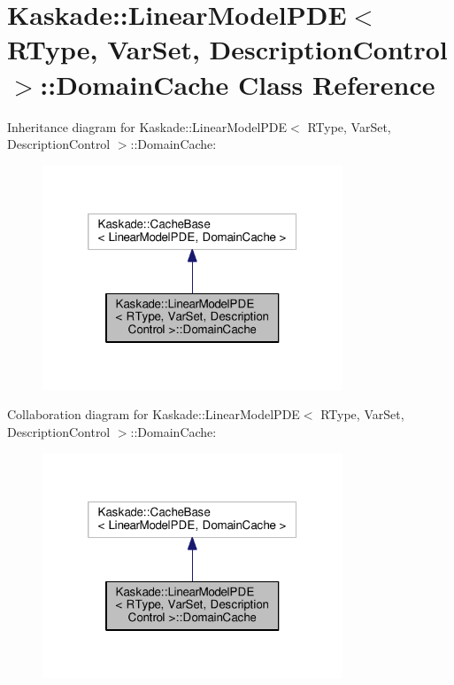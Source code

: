 \hypertarget{classKaskade_1_1LinearModelPDE_1_1DomainCache}{\section{Kaskade\-:\-:Linear\-Model\-P\-D\-E$<$ R\-Type, Var\-Set, Description\-Control $>$\-:\-:Domain\-Cache Class Reference}
\label{classKaskade_1_1LinearModelPDE_1_1DomainCache}
}


Inheritance diagram for Kaskade\-:\-:Linear\-Model\-P\-D\-E$<$ R\-Type, Var\-Set, Description\-Control $>$\-:\-:Domain\-Cache\-:
\nopagebreak
\begin{figure}[H]
\begin{center}
\leavevmode
\includegraphics[width=254pt]{classKaskade_1_1LinearModelPDE_1_1DomainCache__inherit__graph}
\end{center}
\end{figure}


Collaboration diagram for Kaskade\-:\-:Linear\-Model\-P\-D\-E$<$ R\-Type, Var\-Set, Description\-Control $>$\-:\-:Domain\-Cache\-:
\nopagebreak
\begin{figure}[H]
\begin{center}
\leavevmode
\includegraphics[width=254pt]{classKaskade_1_1LinearModelPDE_1_1DomainCache__coll__graph}
\end{center}
\end{figure}
